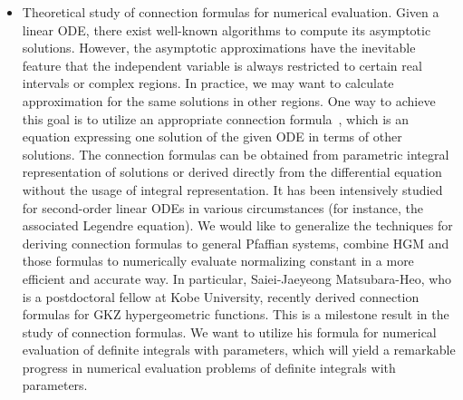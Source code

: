 \documentclass[10pt,a4paper]{article}
\begin{document}
\begin{itemize}
\item Theoretical study of connection formulas for numerical evaluation. Given a linear ODE, there exist well-known algorithms to compute its asymptotic solutions. However, the asymptotic approximations have the inevitable feature that the independent variable is always restricted to certain real intervals or complex regions. In practice, we may want to calculate approximation for the same solutions in other regions. One way to achieve this goal is to utilize an appropriate connection formula~\cite{Oliver74}, which is an equation expressing one solution of the given ODE in terms of other solutions. The connection formulas can be obtained from parametric integral representation of solutions or derived directly from the differential equation without the usage of integral representation. It
has been intensively studied for second-order linear ODEs in various circumstances (for instance, the associated Legendre equation).
We would like to generalize the techniques for deriving connection formulas to general Pfaffian systems, combine HGM and those formulas to numerically evaluate normalizing constant in a more efficient and accurate way. In particular, Saiei-Jaeyeong Matsubara-Heo, who is a postdoctoral fellow at Kobe University, recently derived connection formulas for GKZ hypergeometric functions. This is a milestone result in the study of connection formulas. We want to utilize his formula for numerical evaluation of definite integrals with parameters, which will yield a remarkable progress in numerical evaluation problems of definite integrals with parameters.  



\end{itemize}
\end{document}
